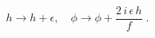 \begin{equation}
h \to h+\epsilon, \quad \phi \to \phi + \frac{2\, i\, \epsilon\, h}{f} \; .
\end{equation}

